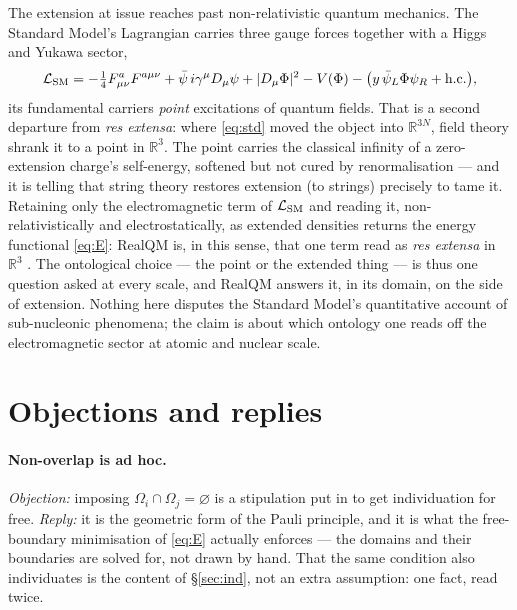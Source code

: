 \documentclass[11pt]{article}
\begin{document}
The extension at issue reaches past non-relativistic quantum mechanics. The Standard Model's Lagrangian
carries three gauge forces together with a Higgs and Yukawa sector,
\begin{equation}
\mathcal L_{\rm SM}=-\tfrac14 F^a_{\mu\nu}F^{a\mu\nu}
+\bar\psi\,i\gamma^\mu D_\mu\psi+|D_\mu\Phi|^2-V(\Phi)-\big(y\,\bar\psi_L\Phi\psi_R+\text{h.c.}\big),
\end{equation}
its fundamental carriers \emph{point} excitations of quantum fields. That is a second departure from
\emph{res extensa}: where \eqref{eq:std} moved the object into $\mathbb R^{3N}$, field theory shrank it to
a point in $\mathbb R^3$. The point carries the classical infinity of a zero-extension charge's
self-energy, softened but not cured by renormalisation --- and it is telling that string theory restores
extension (to strings) precisely to tame it. Retaining only the electromagnetic term of $\mathcal L_{\rm
SM}$ and reading it, non-relativistically and electrostatically, as extended densities returns the energy
functional \eqref{eq:E}: RealQM is, in this sense, that one term read as \emph{res extensa} in
$\mathbb R^3$ \cite{RealQMvsSM}. The ontological choice --- the point or the extended thing --- is thus one
question asked at every scale, and RealQM answers it, in its domain, on the side of extension. Nothing here
disputes the Standard Model's quantitative account of sub-nucleonic phenomena; the claim is about which
ontology one reads off the electromagnetic sector at atomic and nuclear scale.

\section{Objections and replies}
\label{sec:obj}

\paragraph{Non-overlap is ad hoc.} \emph{Objection:} imposing $\Omega_i\cap\Omega_j=\varnothing$ is a
stipulation put in to get individuation for free. \emph{Reply:} it is the geometric form of the Pauli
principle, and it is what the free-boundary minimisation of \eqref{eq:E} actually enforces --- the domains
and their boundaries are solved for, not drawn by hand. That the same condition also individuates is the
content of \S\ref{sec:ind}, not an extra assumption: one fact, read twice.
\end{document}
